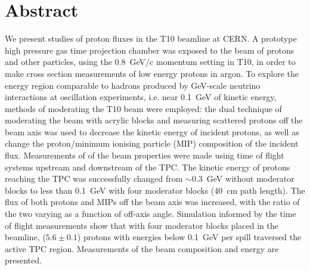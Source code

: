 \section*{Abstract}
We present studies of proton fluxes in the T10 beamline at CERN.
A prototype high pressure gas time projection chamber was exposed to the beam of protons and other particles, using the 0.8~GeV/c momentum setting in T10, in order to make cross section measurements of low energy protons in argon.
To explore the energy region comparable to hadrons produced by GeV-scale neutrino interactions at oscillation experiments, i.e. near 0.1~GeV of kinetic energy, methods of moderating the T10 beam were employed:
the dual technique of moderating the beam with acrylic blocks and measuring scattered protons off the beam axis was used to decrease the kinetic energy of incident protons, as well as change the proton/minimum ionising particle (MIP) composition of the incident flux.
Measurements of of the beam properties were made using time of flight systems upstream and downstream of the TPC. 
The kinetic energy of protons reaching the TPC was successfully changed from $\sim$0.3~GeV without moderator blocks to less than 0.1~GeV with four moderator blocks (40~cm path length).
The flux of both protons and MIPs off the beam axis was increased, with the ratio of the two varying as a function of off-axis angle. 
Simulation informed by the time of flight measurements show that with four moderator blocks placed in the beamline,  ($5.6 \pm 0.1$) protons with energies below 0.1~GeV per spill traversed the active TPC region.
Measurements of the beam composition and energy are presented.
